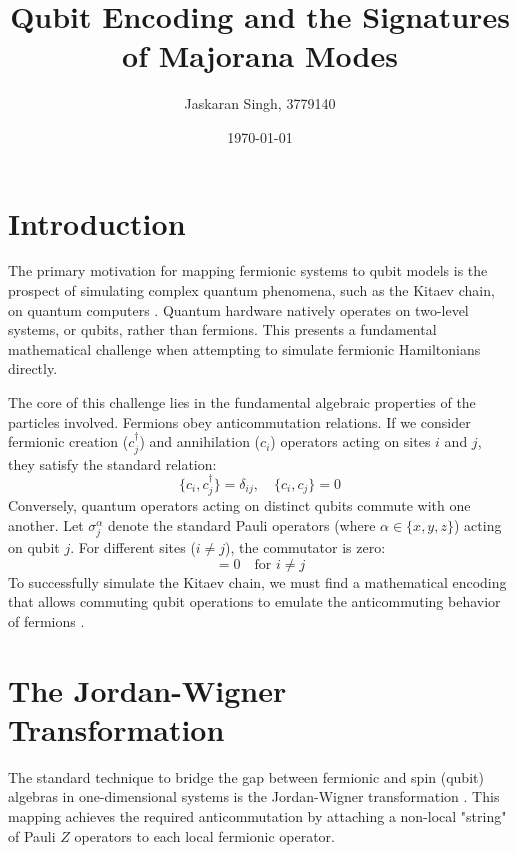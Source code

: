 \documentclass[11pt,a4paper]{article}
\title{Qubit Encoding and the Signatures of Majorana Modes}
\author{Jaskaran Singh, 3779140}
\date{\today}
\begin{document}
\maketitle

\section{Introduction}

The primary motivation for mapping fermionic systems to qubit models is the prospect of simulating complex quantum phenomena, such as the Kitaev chain, on quantum computers \cite{Kitaev2001}. Quantum hardware natively operates on two-level systems, or qubits, rather than fermions. This presents a fundamental mathematical challenge when attempting to simulate fermionic Hamiltonians directly. 

The core of this challenge lies in the fundamental algebraic properties of the particles involved. Fermions obey anticommutation relations. If we consider fermionic creation ($c_j^\dagger$) and annihilation ($c_i$) operators acting on sites $i$ and $j$, they satisfy the standard relation:
\begin{equation}
    \{c_i, c_j^\dagger\} = \delta_{ij}, \quad \{c_i, c_j\} = 0
\end{equation}
Conversely, quantum operators acting on distinct qubits commute with one another. Let $\sigma_j^\alpha$ denote the standard Pauli operators (where $\alpha \in \{x, y, z\}$) acting on qubit $j$. For different sites ($i \neq j$), the commutator is zero:
\begin{equation}
    [\sigma_i^\alpha, \sigma_j^\beta] = 0 \quad \text{for } i \neq j
\end{equation}
To successfully simulate the Kitaev chain, we must find a mathematical encoding that allows commuting qubit operations to emulate the anticommuting behavior of fermions \cite{Kitaev2001}.

\section{The Jordan-Wigner Transformation}

The standard technique to bridge the gap between fermionic and spin (qubit) algebras in one-dimensional systems is the Jordan-Wigner transformation \cite{JordanWigner1928}. This mapping achieves the required anticommutation by attaching a non-local "string" of Pauli $Z$ operators to each local fermionic operator. 
\end{document}
